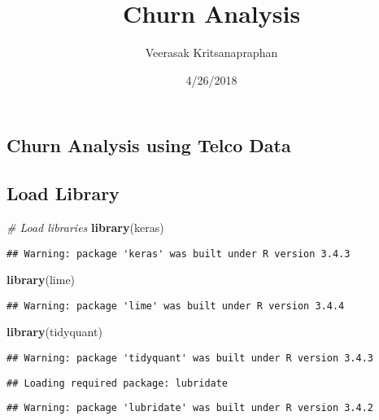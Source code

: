 \documentclass[]{article}
\title{Churn Analysis}
\author{Veerasak Kritsanapraphan}
\date{4/26/2018}
\newenvironment{Shaded}{\begin{snugshade}}{\end{snugshade}}
\newcommand{\KeywordTok}[1]{\textcolor[rgb]{0.13,0.29,0.53}{\textbf{#1}}}
\newcommand{\CommentTok}[1]{\textcolor[rgb]{0.56,0.35,0.01}{\textit{#1}}}
\newcommand{\NormalTok}[1]{#1}
\begin{document}
\maketitle

\subsection{Churn Analysis using Telco
Data}\label{churn-analysis-using-telco-data}

\subsection{Load Library}\label{load-library}

\begin{Shaded}
\begin{Highlighting}[]
\CommentTok{# Load libraries}
\KeywordTok{library}\NormalTok{(keras)}
\end{Highlighting}
\end{Shaded}

\begin{verbatim}
## Warning: package 'keras' was built under R version 3.4.3
\end{verbatim}

\begin{Shaded}
\begin{Highlighting}[]
\KeywordTok{library}\NormalTok{(lime)}
\end{Highlighting}
\end{Shaded}

\begin{verbatim}
## Warning: package 'lime' was built under R version 3.4.4
\end{verbatim}

\begin{Shaded}
\begin{Highlighting}[]
\KeywordTok{library}\NormalTok{(tidyquant)}
\end{Highlighting}
\end{Shaded}

\begin{verbatim}
## Warning: package 'tidyquant' was built under R version 3.4.3
\end{verbatim}

\begin{verbatim}
## Loading required package: lubridate
\end{verbatim}

\begin{verbatim}
## Warning: package 'lubridate' was built under R version 3.4.2
\end{verbatim}
\end{document}
